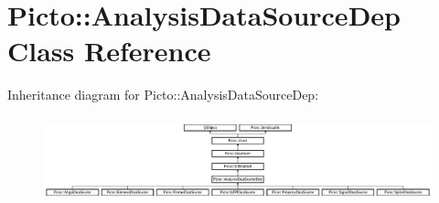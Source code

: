 \hypertarget{class_picto_1_1_analysis_data_source_dep}{\section{Picto\-:\-:Analysis\-Data\-Source\-Dep Class Reference}
\label{class_picto_1_1_analysis_data_source_dep}
}
Inheritance diagram for Picto\-:\-:Analysis\-Data\-Source\-Dep\-:\begin{figure}[H]
\begin{center}
\leavevmode
\includegraphics[height=2.500000cm]{class_picto_1_1_analysis_data_source_dep}
\end{center}
\end{figure}
